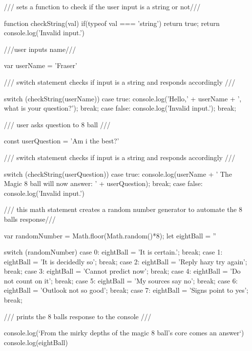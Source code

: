 /// sets a function to check if the user input is a string or not///

function checkString(val){
    if(typeof val === 'string'){
      return true;
    }
    return console.log('Invalid input.')
}

///user inputs name///

var userName = 'Fraser'

/// switch statement checks if input is a string and responds accordingly ///

switch (checkString(userName)){
  case true: console.log('Hello,' + userName + ', what is your question?');
  break;
  case false: console.log('Invalid input.');
  break;
}

/// user asks question to 8 ball ///

const userQuestion = 'Am i the best?'

/// switch statement checks if input is a string and responds accordingly ///

switch (checkString(userQuestion)){
  case true: console.log(userName + ' The Magic 8 ball will now answer: ' + userQuestion);
  break;
  case false: console.log('Invalid input.')
}

/// this math statement creates a random number generator to automate the 8 balls response///

var randomNumber = Math.floor(Math.random()*8);
let eightBall = ''

switch (randomNumber){
  case 0: eightBall = 'It is certain.';
  break;
  case 1: eightBall = 'It is decidedly so';
  break;
  case 2: eightBall = 'Reply hazy try again';
  break;
  case 3: eightBall = 'Cannot predict now';
  break;
  case 4: eightBall = 'Do not count on it';
  break;
  case 5: eightBall = 'My sources say no';
  break;
  case 6: eightBall = 'Outlook not so good';
  break;
  case 7: eightBall = 'Signs point to yes';
  break;
  }

/// prints the 8 balls response to the console ///

  console.log(`From the mirky depths of the magic 8 ball's core comes an answer`)
  console.log(eightBall)